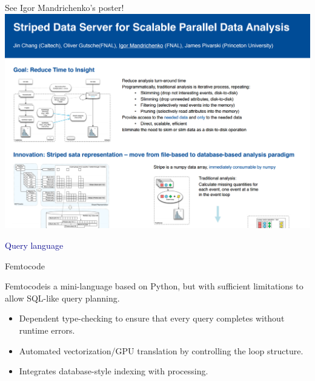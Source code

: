 \documentclass{beamer}
\begin{document}
\begin{frame}{See Igor Mandrichenko's poster!}
\vspace{0.5 cm}
\mbox{\hspace{-0.5 cm}\includegraphics[width=1.1\linewidth]{igor.png}}
\end{frame}

\begin{frame}
\begin{center}
\huge \textcolor{darkblue}{Query language}
\end{center}
\end{frame}

\begin{frame}{Femtocode}
\vspace{0.5 cm}

Femtocode\footnotemark[1] is a mini-language based on Python, but with sufficient limitations to allow SQL-like query planning.

\vspace{0.25 cm}
\begin{itemize}\setlength{\itemsep}{0.25 cm}
\item Dependent type-checking to ensure that every query completes without runtime errors.
\item Automated vectorization/GPU translation by controlling the loop structure.
\item Integrates database-style indexing with processing.
\end{itemize}

\vspace{0.25 cm}
\textcolor{darkblue}{}

\end{frame}
\end{document}
